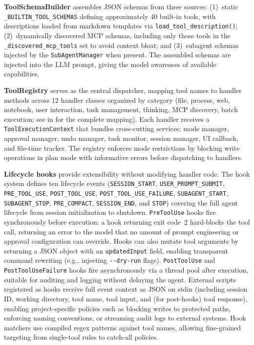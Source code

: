 \textbf{ToolSchemaBuilder} assembles JSON schemas from three sources: (1)~static \texttt{\_BUILTIN\_TOOL\_SCHEMAS} defining approximately 40 built-in tools, with descriptions loaded from markdown templates via \texttt{load\_tool\_description()}; (2)~dynamically discovered MCP schemas, including only those tools in the \texttt{\_discovered\_mcp\_tools} set to avoid context bloat; and (3)~subagent schemas injected by the \texttt{SubAgentManager} when present. The assembled schemas are injected into the LLM prompt, giving the model awareness of available capabilities.

\textbf{ToolRegistry} serves as the central dispatcher, mapping tool names to handler methods across 12 handler classes organized by category (file, process, web, notebook, user interaction, task management, thinking, MCP discovery, batch execution; see  in  for the complete mapping). Each handler receives a \texttt{ToolExecutionContext} that bundles cross-cutting services: mode manager, approval manager, undo manager, task monitor, session manager, UI callback, and file-time tracker. The registry enforces mode restrictions by blocking write operations in plan mode with informative errors before dispatching to handlers.

\textbf{Lifecycle hooks} provide extensibility without modifying handler code. The hook system defines ten lifecycle events (\texttt{SESSION\_START}, \texttt{USER\_PROMPT\_SUBMIT}, \texttt{PRE\_TOOL\_USE}, \texttt{POST\_TOOL\_USE}, \texttt{POST\_TOOL\_USE\_FAILURE}, \texttt{SUBAGENT\_START}, \texttt{SUBAGENT\_STOP}, \texttt{PRE\_COMPACT}, \texttt{SESSION\_END}, and \texttt{STOP}) covering the full agent lifecycle from session initialization to shutdown. \texttt{PreToolUse} hooks fire synchronously before execution: a hook returning exit code~2 hard-blocks the tool call, returning an error to the model that no amount of prompt engineering or approval configuration can override. Hooks can also mutate tool arguments by returning a JSON object with an \texttt{updatedInput} field, enabling transparent command rewriting (e.g., injecting \texttt{-{}-dry-run} flags). \texttt{PostToolUse} and \texttt{PostToolUseFailure} hooks fire asynchronously via a thread pool after execution, suitable for auditing and logging without delaying the agent. External scripts registered as hooks receive full event context as JSON on stdin (including session ID, working directory, tool name, tool input, and (for post-hooks) tool response), enabling project-specific policies such as blocking writes to protected paths, enforcing naming conventions, or streaming audit logs to external systems. Hook matchers use compiled regex patterns against tool names, allowing fine-grained targeting from single-tool rules to catch-all policies.

